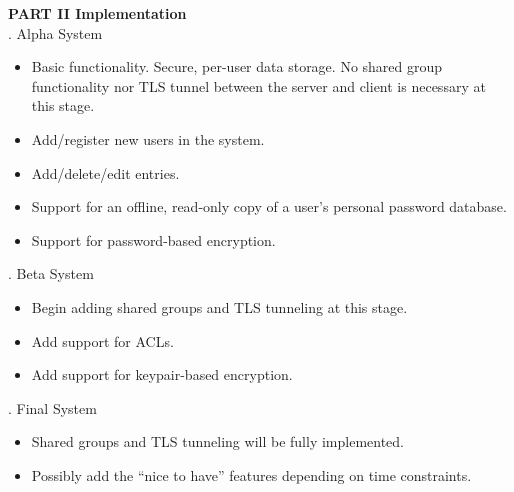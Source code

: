 \documentclass[11pt, letterpaper]{article}
\newcommand{\DesignSection}[1]
{\noindent\textbf{#1}\\}
\begin{document}
\DesignSection{PART II Implementation}
. Alpha System
\begin{itemize} \itemsep1pt \parskip0pt 
\item Basic functionality. Secure, per-user data storage. No shared group functionality nor TLS tunnel between the server and client is necessary at this stage.
\item Add/register new users in the system.
\item Add/delete/edit entries.
\item Support for an offline, read-only copy of a user’s personal password database.
\item Support for password-based encryption.
\end{itemize}
. Beta System
\begin{itemize} \itemsep1pt \parskip0pt 
\item Begin adding shared groups and TLS tunneling at this stage.
\item Add support for ACLs.
\item Add support for keypair-based encryption.
\end{itemize}
. Final System
\begin{itemize} \itemsep1pt \parskip0pt 
\item Shared groups and TLS tunneling will be fully implemented.
\item Possibly add the “nice to have” features depending on time constraints.
\end{itemize}
\end{document}
